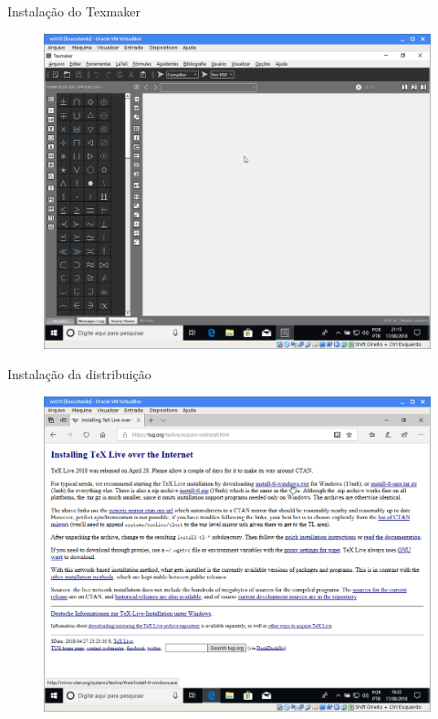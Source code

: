 \documentclass{beamer}
\begin{document}
\begin{frame}{Instala\c{c}\~ao do Texmaker}
    \begin{figure}[h]
        \includegraphics[scale=0.25]{fig/texmaker-02.png}
    \end{figure}
\end{frame}

\begin{frame}{Instala\c{c}\~ao da distribui\c{c}\~ao}
    \begin{figure}[h]
        \includegraphics[scale=0.25]{fig/texlive-site.png}
    \end{figure}
\end{frame}
\end{document}
